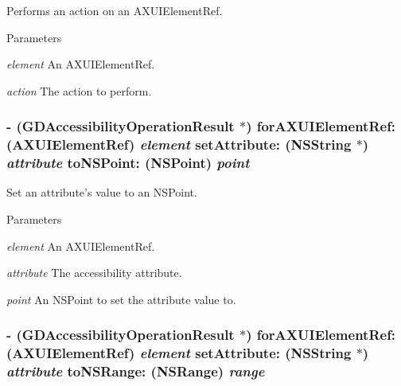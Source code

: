 Performs an action on an AXUIElementRef. 
\begin{DoxyParams}{Parameters}
\item[{\em element}]An AXUIElementRef. \item[{\em action}]The action to perform. \end{DoxyParams}
\hypertarget{interface_g_d_accessibility_manager_aebd9e4bd904df0513641112d83df41d8}{
\subsubsection[{forAXUIElementRef:setAttribute:toNSPoint:}]{\setlength{\rightskip}{0pt plus 5cm}-\/ ({\bf GDAccessibilityOperationResult} $\ast$) forAXUIElementRef: (AXUIElementRef) {\em element}\/ setAttribute: ({\bf NSString} $\ast$) {\em attribute}\/ toNSPoint: (NSPoint) {\em point}}}
\label{interface_g_d_accessibility_manager_aebd9e4bd904df0513641112d83df41d8}


Set an attribute's value to an NSPoint. 
\begin{DoxyParams}{Parameters}
\item[{\em element}]An AXUIElementRef. \item[{\em attribute}]The accessibility attribute. \item[{\em point}]An NSPoint to set the attribute value to. \end{DoxyParams}
\hypertarget{interface_g_d_accessibility_manager_acabbfd253bc37b73d799978bcabb37b4}{
\subsubsection[{forAXUIElementRef:setAttribute:toNSRange:}]{\setlength{\rightskip}{0pt plus 5cm}-\/ ({\bf GDAccessibilityOperationResult} $\ast$) forAXUIElementRef: (AXUIElementRef) {\em element}\/ setAttribute: ({\bf NSString} $\ast$) {\em attribute}\/ toNSRange: (NSRange) {\em range}}}
\label{interface_g_d_accessibility_manager_acabbfd253bc37b73d799978bcabb37b4}


